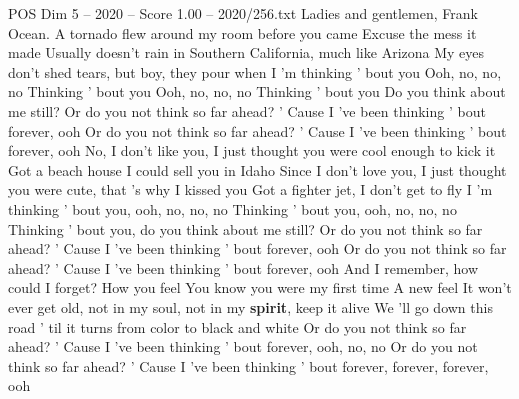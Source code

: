 \begin{textsample}{POS Dim 5 – 2020 – Score 1.00 – 2020/256.txt}  \label{ex:f5_pos_025}
Ladies and gentlemen, Frank Ocean.
A tornado flew around my room before you came Excuse the mess it made Usually doesn't rain in Southern California, much like Arizona My eyes don't shed tears, but boy, they pour when I 'm thinking ' bout you Ooh, no, no, no Thinking ' bout you Ooh, no, no, no Thinking ' bout you Do you think about me still?
Or do you not think so far ahead? ' Cause I 've been thinking ' bout forever, ooh Or do you not think so far ahead? ' Cause I 've been thinking ' bout forever, ooh No, I don't like you, I just thought you were cool enough to kick it Got a beach house I could sell you in Idaho Since I don't love you, I just thought you were cute, that 's why I kissed you Got a fighter jet, I don't get to fly I 'm thinking ' bout you, ooh, no, no, no Thinking ' bout you, ooh, no, no, no Thinking ' bout you, do you think about me still?
Or do you not think so far ahead? ' Cause I 've been thinking ' bout forever, ooh Or do you not think so far ahead? ' Cause I 've been thinking ' bout forever, ooh And I remember, how could I forget?
How you feel You know you were my first time A new feel It won't ever get old, not in my soul, not in my \textbf{spirit}, keep it alive We 'll go down this road ' til it turns from color to black and white Or do you not think so far ahead? ' Cause I 've been thinking ' bout forever, ooh, no, no Or do you not think so far ahead? ' Cause I 've been thinking ' bout forever, forever, forever, ooh

\end{textsample}
